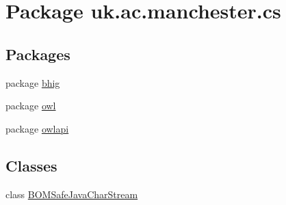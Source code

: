 \hypertarget{namespaceuk_1_1ac_1_1manchester_1_1cs}{\section{Package uk.\-ac.\-manchester.\-cs}
\label{namespaceuk_1_1ac_1_1manchester_1_1cs}
}
\subsection*{Packages}
\begin{DoxyCompactItemize}
\item 
package \hyperlink{namespaceuk_1_1ac_1_1manchester_1_1cs_1_1bhig}{bhig}
\item 
package \hyperlink{namespaceuk_1_1ac_1_1manchester_1_1cs_1_1owl}{owl}
\item 
package \hyperlink{namespaceuk_1_1ac_1_1manchester_1_1cs_1_1owlapi}{owlapi}
\end{DoxyCompactItemize}
\subsection*{Classes}
\begin{DoxyCompactItemize}
\item 
class \hyperlink{classuk_1_1ac_1_1manchester_1_1cs_1_1_b_o_m_safe_java_char_stream}{B\-O\-M\-Safe\-Java\-Char\-Stream}
\end{DoxyCompactItemize}
